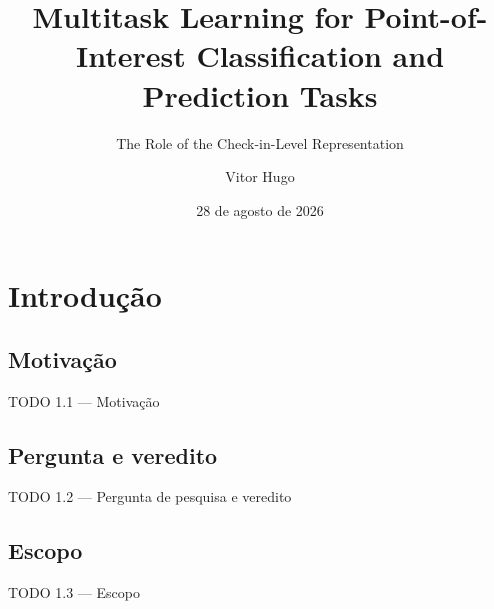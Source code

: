 \documentclass{beamer}
\title[Título curto]{Multitask Learning for Point-of-Interest Classification and Prediction Tasks}
\subtitle{The Role of the Check-in-Level Representation}
\author{Vitor Hugo}
\institute[UFV]{Universidade Federal de Viçosa --- PPGCC}
\date{28 de agosto de 2026}
\begin{document}


\section{Introdução}

\subsection{Motivação}
\begin{frame}{TODO 1.1 --- Motivação}
\end{frame}

\subsection{Pergunta e veredito}
\begin{frame}{TODO 1.2 --- Pergunta de pesquisa e veredito}
\end{frame}

\subsection{Escopo}
\begin{frame}{TODO 1.3 --- Escopo}
\end{frame}
\end{document}
